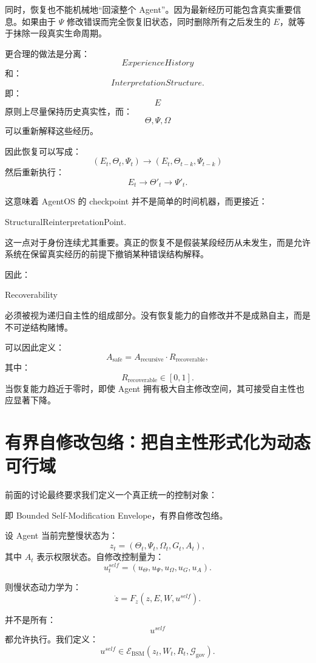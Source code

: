 同时，恢复也不能机械地“回滚整个 Agent”。因为最新经历可能包含真实重要信息。如果由于 $\Psi$ 修改错误而完全恢复旧状态，同时删除所有之后发生的 $E$，就等于抹除一段真实生命周期。

更合理的做法是分离：
\[
ExperienceHistory
\]
和：
\[
InterpretationStructure.
\]
即：
\[
E
\]
原则上尽量保持历史真实性，而：
\[
\Theta,\Psi,\Omega
\]
可以重新解释这些经历。

因此恢复可以写成：
\[
(E_t,\Theta_t,\Psi_t)
\rightarrow
(E_t,\Theta_{t-k},\Psi_{t-k})
\]
然后重新执行：
\[
E_t
\rightarrow
\Theta'_{t}
\rightarrow
\Psi'_t.
\]

这意味着 AgentOS 的 checkpoint 并不是简单的时间机器，而更接近：
\begin{statementbox}
StructuralReinterpretationPoint.
\end{statementbox}

这一点对于身份连续尤其重要。真正的恢复不是假装某段经历从未发生，而是允许系统在保留真实经历的前提下撤销某种错误结构解释。

因此：
\begin{statementbox}
Recoverability
\end{statementbox}
必须被视为递归自主性的组成部分。没有恢复能力的自修改并不是成熟自主，而是不可逆结构赌博。

可以因此定义：
\[
A_{\mathrm{safe}}
=
A_{\mathrm{recursive}}
\cdot
R_{\mathrm{recoverable}},
\]
其中：
\[
R_{\mathrm{recoverable}}\in[0,1].
\]
当恢复能力趋近于零时，即使 Agent 拥有极大自主修改空间，其可接受自主性也应显著下降。

\section{有界自修改包络：把自主性形式化为动态可行域}

前面的讨论最终要求我们定义一个真正统一的控制对象：
\begin{statementbox}
\centering
{}
\end{statementbox}
即 Bounded Self-Modification Envelope，有界自修改包络。

设 Agent 当前完整慢状态为：
\[
z_t
=
(\Theta_t,\Psi_t,\Omega_t,G_t,A_t),
\]
其中 $A_t$ 表示权限状态。自修改控制量为：
\[
u_t^{self}
=
(
u_\Theta,
u_\Psi,
u_\Omega,
u_G,
u_A
).
\]

则慢状态动力学为：
\[
\dot z
=
F_z(
z,
E,
W,
u^{self}
).
\]

并不是所有：
\[
u^{self}
\]
都允许执行。我们定义：
\[
\boxed{
u^{self}
\in
\mathcal E_{\mathrm{BSM}}
(
z_t,
W_t,
R_t,
\mathcal G_{\mathrm{gov}}
).
}
\]

